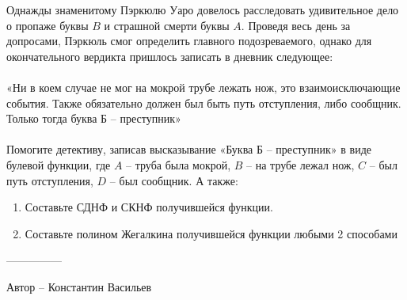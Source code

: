 \question
Однажды знаменитому Пэркюлю Уаро довелось расследовать удивительное дело о пропаже буквы $B$ и страшной смерти буквы $A$. Проведя весь день за допросами, Пэркюль смог определить главного подозреваемого, однако для окончательного вердикта пришлось записать в дневник следующее:
\\
\\
«Ни в коем случае не мог на мокрой трубе лежать нож, это взаимоисключающие события. Также обязательно должен был быть путь отступления, либо сообщник. Только тогда буква Б – преступник»
\\
\\
Помогите детективу, записав высказывание «Буква Б – преступник» в виде булевой функции, где $A$ – труба была мокрой, $B$ – на трубе лежал нож, $C$ – был путь отступления, $D$ – был сообщник. А также:
\begin{enumerate}
    \item Составьте СДНФ и СКНФ получившейся функции.
    \item Составьте полином Жегалкина получившейся функции любыми 2 способами
\end{enumerate}

---------------

Автор -- Константин Васильев